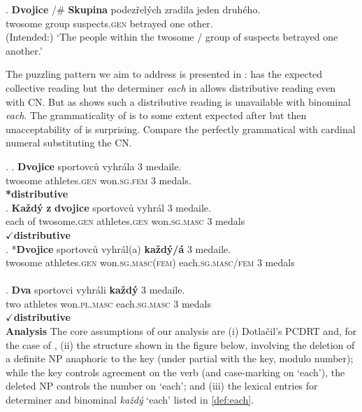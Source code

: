 \documentclass[12pt, a4paper]{scrartcl}
\begin{document}
\exg. \textbf{Dvojice} /\#\hspace{-2pt} \textbf{Skupina} podezřelých zradila jeden druhého.\\
twosome {} group suspects.\textsc{gen} betrayed one other.\\
(Intended:) `The people within the twosome / group of suspects betrayed one another.'\vspace{-4pt}

The puzzling pattern we aim to address is presented in \Next: \Next[a] has the expected collective reading but the determiner \textit{each} in \Next[b] allows distributive reading even with CN. But as \Next[c] shows such a distributive reading is unavailable with binominal \textit{each}. The grammaticality of \Next[b] is to some extent expected after \Last but then unacceptability of \Next[c] is surprising. Compare the perfectly grammatical \Next[d] with cardinal numeral substituting the CN.\vspace{-4pt}

\ex. \ag. \textbf{Dvojice} sportovců vyhrála 3 medaile.\label{ex:dvojice-cum}\\
twosome athletes.\textsc{gen} won.\textsc{sg.fem} 3 medals.\\\hfill \textbf{*distributive}\\\vspace{-4pt}
\bg. \textbf{Každý} \textbf{z} \textbf{dvojice} sportovců vyhrál 3 medaile.\label{ex:dvojice-det-each}\\
each of twosome.\textsc{gen} athletes.\textsc{gen} won.\textsc{sg.masc} 3 medals\\\hfill $\checkmark$\textbf{distributive}\\\vspace{-4pt}
\bg. *\textbf{Dvojice} sportovců vyhrál(a) \textbf{každý/á} 3 medaile.\label{ex:dvojice-bin-each}\\
twosome athletes.\textsc{gen} won.\textsc{sg.masc(fem)} each.\textsc{sg.masc/fem} 3 medals\\ \\\vspace{-4pt}
\bg. \textbf{Dva} sportovci vyhráli \textbf{každý} 3 medaile.\label{ex:dva-bin-each}\\
two athletes won.\textsc{pl.masc} each.\textsc{sg.masc} 3 medals\\\hfill$\checkmark$\textbf{distributive}\\

\vspace{-8pt}\textbf{Analysis} The core assumptions of our analysis are (i) Dotlačil's PCDRT and, for the case of \Last[d], (ii) the structure shown in the figure below, involving the deletion of a definite NP anaphoric to the key (under partial with the key, modulo number); while the key controls agreement on the verb (and case-marking on `each'), the deleted NP controls the number on `each'; and (iii) the lexical entries for determiner and binominal \textit{každý} `each' listed in \ref{def:each}.\vspace{-4pt}
\end{document}
